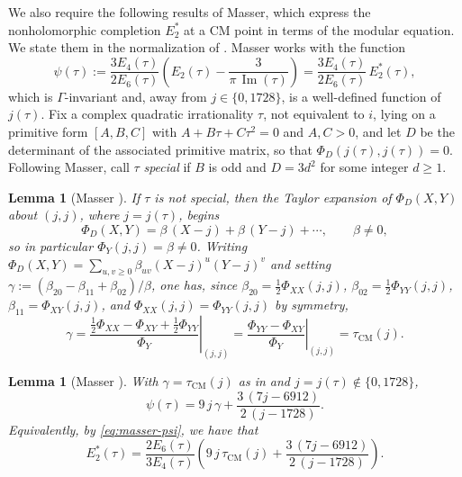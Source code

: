 \documentclass[12pt]{amsart}
\newtheorem{lemma}[theorem]{Lemma}
\theoremstyle{definition}
\theoremstyle{remark}
\newcommand{\im}{\operatorname{Im}}
\begin{document}
We also require the following results of Masser, which express the nonholomorphic
completion $E_2^*$ at a CM point in terms of the modular equation. We state them in the
normalization of \cite[Appendix, pp.~114--120]{Masser}. Masser works with the function
\begin{equation}\label{eq:masser-psi}
\psi(\tau):=\frac{3E_4(\tau)}{2E_6(\tau)}\left(E_2(\tau)-\frac{3}{\pi\,\im(\tau)}\right)
=\frac{3E_4(\tau)}{2E_6(\tau)}\,E_2^*(\tau),
\end{equation}
which is $\Gamma$-invariant and, away from $j\in\{0,1728\}$, is a well-defined function of
$j(\tau)$. Fix a complex quadratic irrationality $\tau$, not equivalent to $i$, lying on a
primitive form $[A,B,C]$ with $A+B\tau+C\tau^2=0$ and $A,C>0$, and let $D$ be the determinant
of the associated primitive matrix, so that $\Phi_D(j(\tau),j(\tau))=0$. Following Masser, call
$\tau$ {\it special} if $B$ is odd and $D=3d^2$ for some integer $d\ge1$.

\begin{lemma}[Masser {\cite[Lemma~A2]{Masser}}]\label{masser_lemma}
If $\tau$ is not special, then the Taylor expansion of $\Phi_D(X,Y)$ about $(j,j)$, where
$j=j(\tau)$, begins
\[
        \Phi_D(X,Y)=\beta\,(X-j)+\beta\,(Y-j)+\cdots,\qquad \beta\ne0,
\]
so in particular $\Phi_Y(j,j)=\beta\ne0$. Writing
$\Phi_D(X,Y)=\sum_{u,v\ge0}\beta_{uv}(X-j)^u(Y-j)^v$ and setting
$\gamma:=(\beta_{20}-\beta_{11}+\beta_{02})/\beta$, one has, since $\beta_{20}=\tfrac12\Phi_{XX}(j,j)$,
$\beta_{02}=\tfrac12\Phi_{YY}(j,j)$, $\beta_{11}=\Phi_{XY}(j,j)$, and $\Phi_{XX}(j,j)=\Phi_{YY}(j,j)$
by symmetry,
\begin{equation}\label{eq:gamma-eq-tangent}
\gamma=\left.\frac{\tfrac12\Phi_{XX}-\Phi_{XY}+\tfrac12\Phi_{YY}}{\Phi_Y}\right|_{(j,j)}
=\left.\frac{\Phi_{YY}-\Phi_{XY}}{\Phi_Y}\right|_{(j,j)}=\tau_{\mathrm{CM}}(j).
\end{equation}
\end{lemma}

\begin{lemma}[Masser {\cite[Theorem~A1, eq.~(106)]{Masser}}]\label{masser_thmA1}
With $\gamma=\tau_{\mathrm{CM}}(j)$ as in  and $j=j(\tau)\notin\{0,1728\}$,
\begin{equation}\label{eq:masser-106}
\psi(\tau)=9\,j\,\gamma+\frac{3\,(7j-6912)}{2\,(j-1728)}.
\end{equation}
Equivalently, by \eqref{eq:masser-psi}, we have that
\begin{equation}\label{eq:E2star-closed}
E_2^*(\tau)=\frac{2E_6(\tau)}{3E_4(\tau)}\left(9\,j\,\tau_{\mathrm{CM}}(j)
+\frac{3\,(7j-6912)}{2\,(j-1728)}\right).
\end{equation}
\end{lemma}
\end{document}
